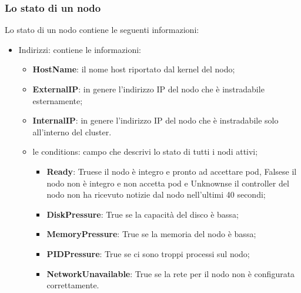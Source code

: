 \documentclass{article}
\begin{document}
\subsubsection{Lo stato di un nodo}
Lo stato di un nodo contiene le seguenti informazioni:
\begin{itemize}
    \item Indirizzi: contiene le informazioni: \begin{itemize}
        \item \textbf{HostName}: il nome host riportato dal kernel del nodo;
        \item \textbf{ExternalIP}: in genere l'indirizzo IP del nodo che è instradabile esternamente;
        \item \textbf{InternalIP}: in genere l'indirizzo IP del nodo che è instradabile solo all'interno del cluster.
    \item le conditions: campo che descrivi lo stato di tutti i nodi attivi;
        \begin{itemize}
            \item \textbf{Ready}: Truese il nodo è integro e pronto ad accettare pod, Falsese il nodo non è integro e non accetta pod e Unknownse il controller del nodo non ha ricevuto notizie dal nodo nell'ultimi 40 secondi; 
            \item \textbf{DiskPressure}: True se la capacità del disco è bassa;
            \item \textbf{MemoryPressure}: True se la memoria del nodo è bassa;
            \item \textbf{PIDPressure}: True se ci sono troppi processi sul nodo;
            \item \textbf{NetworkUnavailable}: True se la rete per il nodo non è configurata correttamente.
        \end{itemize}
    \end{itemize}
\end{itemize}
\end{document}
